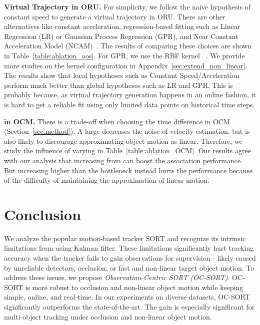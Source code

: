 \documentclass[10pt,twocolumn,letterpaper]{article}
\begin{document}
\noindent\textbf{Virtual Trajectory in ORU.} 
For simplicity, we follow the naive hypothesis of constant speed to generate a virtual trajectory in ORU. There are other alternatives like constant acceleration, regression-based fitting such as Linear Regression (LR) or Gaussian Process Regression (GPR), and Near Constant Acceleration Model (NCAM)~\cite{jazwinski2007stochastic}. 
The results of comparing these choices are shown in Table~\ref{table:ablation_oos}. For GPR, we use the RBF kernel~\cite{rbf} . We provide more studies on the kernel configuration in Appendix~\ref{sec:extend_non_linear}. The results show that local hypotheses such as Constant Speed/Acceleration perform much better than global hypotheses such as LR and GPR. This is probably because, as virtual trajectory generation happens in an online fashion, it is hard to get a reliable fit using only limited data points on historical time steps.

\noindent\textbf{ in OCM.} There is a trade-off when choosing the time difference  in OCM (Section~\ref{sec:method}). A large  decreases the noise of velocity estimation. but is also likely to discourage approximating object motion as linear. Therefore, we study the influence of varying  in Table~\ref{table:ablation_OCM}. Our results agree with our analysis that increasing  from  can boost the association performance. But increasing  higher than the bottleneck instead hurts the performance because of the difficulty of maintaining the approximation of linear motion.


\vspace{-0.2cm}
\section{Conclusion}
\vspace{-0.2cm}
We analyze the popular motion-based tracker SORT and recognize its intrinsic limitations from using Kalman filter. These limitations significantly hurt tracking accuracy when the tracker fails to gain observations for supervision - likely caused by unreliable detectors, occlusion, or fast and non-linear target object motion. 
To address these issues, we propose \textit{Observation-Centric SORT (OC-SORT)}. OC-SORT is more robust to occlusion and non-linear object motion while keeping  simple, online, and real-time. In our experiments on diverse datasets, OC-SORT significantly outperforms the state-of-the-art. The gain is especially significant for multi-object tracking under occlusion and non-linear object motion.
\end{document}
